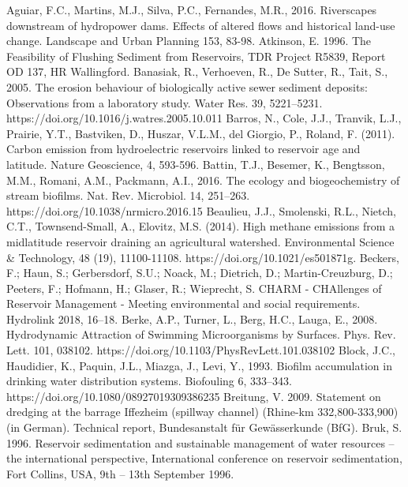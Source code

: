 
\begin{thebibliography}{}
Aguiar, F.C., Martins, M.J., Silva, P.C., Fernandes, M.R., 2016. Riverscapes downstream of hydropower dams. Effects of altered flows and historical land-use change. Landscape and Urban Planning 153, 83-98.
Atkinson, E. 1996. The Feasibility of Flushing Sediment from Reservoirs, TDR Project R5839, Report OD 137, HR Wallingford.
Banasiak, R., Verhoeven, R., De Sutter, R., Tait, S., 2005. The erosion behaviour of biologically active sewer sediment deposits: Observations from a laboratory study. Water Res. 39, 5221–5231. https://doi.org/10.1016/j.watres.2005.10.011
Barros, N., Cole, J.J., Tranvik, L.J., Prairie, Y.T., Bastviken, D., Huszar, V.L.M., del Giorgio, P., Roland, F. (2011). Carbon emission from hydroelectric reservoirs linked to reservoir age and latitude. Nature Geoscience, 4, 593-596.
Battin, T.J., Besemer, K., Bengtsson, M.M., Romani, A.M., Packmann, A.I., 2016. The ecology and biogeochemistry of stream biofilms. Nat. Rev. Microbiol. 14, 251–263. https://doi.org/10.1038/nrmicro.2016.15
Beaulieu, J.J., Smolenski, R.L., Nietch, C.T., Townsend-Small, A., Elovitz, M.S. (2014). High methane emissions from a midlatitude reservoir draining an agricultural watershed. Environmental Science & Technology, 48 (19), 11100-11108. https://doi.org/10.1021/es501871g.
Beckers, F.; Haun, S.; Gerbersdorf, S.U.; Noack, M.; Dietrich, D.; Martin-Creuzburg, D.; Peeters, F.; Hofmann, H.; Glaser, R.; Wieprecht, S. CHARM - CHAllenges of Reservoir Management - Meeting environmental and social requirements. Hydrolink 2018, 16–18.
Berke, A.P., Turner, L., Berg, H.C., Lauga, E., 2008. Hydrodynamic Attraction of Swimming Microorganisms by Surfaces. Phys. Rev. Lett. 101, 038102. https://doi.org/10.1103/PhysRevLett.101.038102
Block, J.C., Haudidier, K., Paquin, J.L., Miazga, J., Levi, Y., 1993. Biofilm accumulation in drinking water distribution systems. Biofouling 6, 333–343. https://doi.org/10.1080/08927019309386235
Breitung, V. 2009. Statement on dredging at the barrage Iffezheim (spillway channel) (Rhine-km 332,800-333,900) (in German). Technical report, Bundesanstalt für Gewässerkunde (BfG).
Bruk, S. 1996. Reservoir sedimentation and sustainable management of water resources – the international perspective, International conference on reservoir sedimentation, Fort Collins, USA, 9th – 13th September 1996.

\end{thebibliography}
